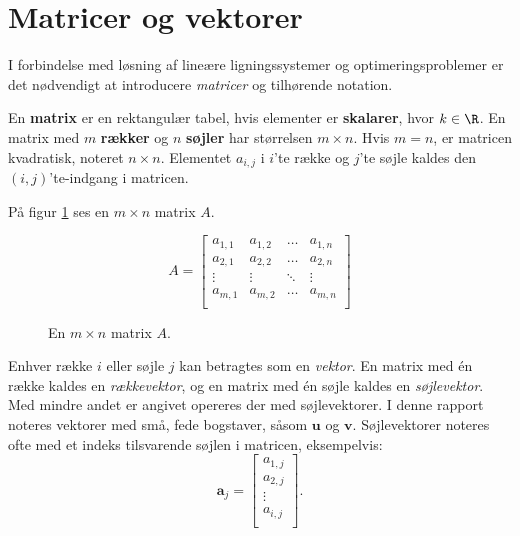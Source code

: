\section{Matricer og vektorer}
%  
%
I forbindelse med løsning af lineære ligningssystemer og optimeringsproblemer er det nødvendigt at introducere \textit{matricer} og tilhørende notation. 
%
\begin{defn}{}{}
En \textbf{matrix} er en rektangulær tabel, hvis elementer er \textbf{skalarer}, hvor $k \in \R$. 
En matrix med $m$ \textbf{rækker} og $n$ \textbf{søjler} har størrelsen $m \times n$.
Hvis $m=n$, er matricen kvadratisk, noteret $n \times n$.
Elementet $a_{i,j}$ i $i$'te række og $j$'te søjle kaldes den $(i,j)$'te-indgang i matricen. 
\end{defn}
\noindent
%
På figur \ref{fig:matrix_gen_eks} ses en $m \times n$ matrix $A$.
%
\begin{figure}[H]
	\begin{center}
$$
A=
\begin{bmatrix}
a_{1,1} & a_{1,2} & \ldots & a_{1,n} \\
a_{2,1} & a_{2,2} & \ldots & a_{2,n} \\
\vdots  & \vdots  & \ddots & \vdots \\
a_{m,1} & a_{m,2} & \ldots & a_{m,n} \\
\end{bmatrix}
$$
	\end{center}
	\caption{En $m \times n$ matrix $A$.}
	\label{fig:matrix_gen_eks}
\end{figure}
%
\noindent
Enhver række $i$ eller søjle $j$ kan betragtes som en \textit{vektor}. 
En matrix med én række kaldes en \textit{rækkevektor}, og en matrix med én søjle kaldes en \textit{søjlevektor}. 
Med mindre andet er angivet opereres der med søjlevektorer.
I denne rapport noteres vektorer med små, fede bogstaver, såsom $\textbf{u}$ og $\textbf{v}$. 
Søjlevektorer noteres ofte med et indeks tilsvarende søjlen i matricen, eksempelvis:
%
$$
\textbf{a}_j= 
\begin{bmatrix}
a_{1,j} \\
a_{2,j} \\
\vdots \\
a_{i,j} \\
\end{bmatrix}.
$$ 